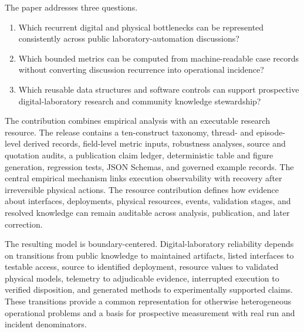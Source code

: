 The paper addresses three questions.
\begin{enumerate}[label=\textbf{RQ\arabic*.}]
  \item Which recurrent digital and physical bottlenecks can be represented consistently across public laboratory-automation discussions?
  \item Which bounded metrics can be computed from machine-readable case records without converting discussion recurrence into operational incidence?
  \item Which reusable data structures and software controls can support prospective digital-laboratory research and community knowledge stewardship?
\end{enumerate}

The contribution combines empirical analysis with an executable research resource. The release contains a ten-construct taxonomy, thread- and episode-level derived records, field-level metric inputs, robustness analyses, source and quotation audits, a publication claim ledger, deterministic table and figure generation, regression tests, JSON Schemas, and governed example records. The central empirical mechanism links execution observability with recovery after irreversible physical actions. The resource contribution defines how evidence about interfaces, deployments, physical resources, events, validation stages, and resolved knowledge can remain auditable across analysis, publication, and later correction.

The resulting model is boundary-centered. Digital-laboratory reliability depends on transitions from public knowledge to maintained artifacts, listed interfaces to testable access, source to identified deployment, resource values to validated physical models, telemetry to adjudicable evidence, interrupted execution to verified disposition, and generated methods to experimentally supported claims. These transitions provide a common representation for otherwise heterogeneous operational problems and a basis for prospective measurement with real run and incident denominators.
